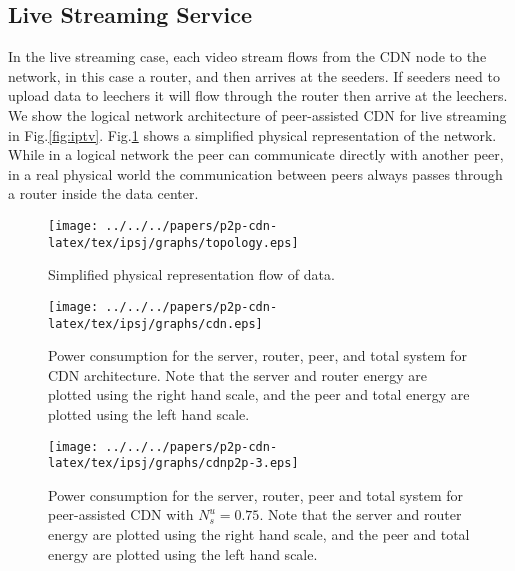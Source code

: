 \subsection{Live Streaming Service}
In the live streaming case, each video stream flows from the CDN node to the network, in this case a router, and then arrives at the seeders. 
If seeders need to upload data to leechers it will flow through the router then arrive at the leechers. 
We show the logical network architecture of peer-assisted CDN for live streaming in Fig.\ref{fig:iptv}. 
Fig.\ref{fig:dummy} shows a simplified physical representation of the network. While in a logical network the peer can communicate directly with another peer, in a real physical world the communication between peers always passes through a router inside the data center.


\begin{figure}[h]
\begin{center}
\texttt{[image: ../../../papers/p2p-cdn-latex/tex/ipsj/graphs/topology.eps]}
\end{center}
\caption{Simplified physical representation flow of data.}
\label{fig:dummy}
\vspace{-2mm}
\end{figure} 

\begin{figure}[h]
\begin{center}
\texttt{[image: ../../../papers/p2p-cdn-latex/tex/ipsj/graphs/cdn.eps]}
\end{center}
\caption{Power consumption for the server, router, peer, and total system for CDN architecture. Note that the server and router energy are plotted using the right hand scale, and the peer and total energy are plotted using the left hand scale.}
\label{fig:purecdn}
\vspace{-2mm}
\end{figure} 

\begin{figure}[h]
\begin{center}
\texttt{[image: ../../../papers/p2p-cdn-latex/tex/ipsj/graphs/cdnp2p-3.eps]}
\end{center}
\caption{Power consumption for the server, router, peer and total system for peer-assisted CDN with $N_s^u=0.75$. Note that the server and router energy are plotted using the right hand scale, and the peer and total energy are plotted using the left hand scale.}
\label{fig:cdnp2p}
\vspace{-2mm}
\end{figure} 


